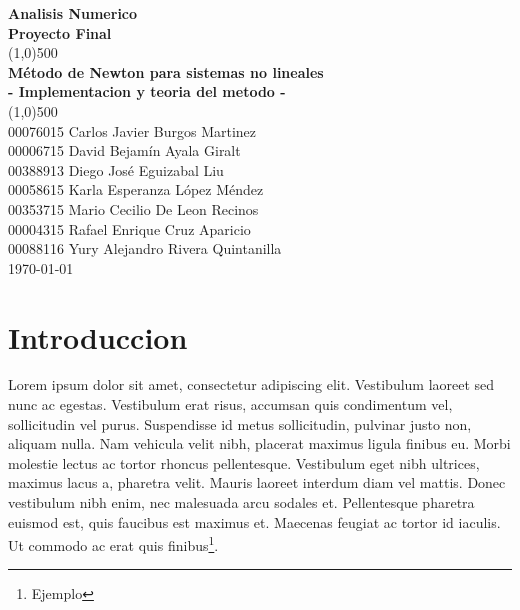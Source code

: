 \documentclass[11pt]{article}
\begin{document}
\begin{titlepage}

\begin{center}
\Large{\textbf{Analisis Numerico}}\\
\Large{\textbf{Proyecto Final}}\\
\vfill
\line(1,0){500}\\[1mm]

\huge{\textbf{Método de Newton para sistemas no lineales}}\\[3mm]
\Large{\textbf{- Implementacion y teoria del metodo -}}\\[1mm]

\line(1,0){500}\\
00076015 Carlos Javier Burgos Martinez\\
00006715 David Bejamín Ayala Giralt\\
00388913 Diego José Eguizabal Liu\\
00058615 Karla Esperanza López Méndez\\
00353715 Mario Cecilio De Leon Recinos\\
00004315 Rafael Enrique Cruz Aparicio \\
00088116 Yury Alejandro Rivera Quintanilla\\
\vfill
\today\\

\end{center}

\end{titlepage}

\tableofcontents
\thispagestyle{empty}
\clearpage

\setcounter{page}{1}

\section{Introduccion}

Lorem ipsum dolor sit amet, consectetur adipiscing elit. Vestibulum laoreet sed nunc ac egestas. Vestibulum erat risus, accumsan quis condimentum vel, sollicitudin vel purus. Suspendisse id metus sollicitudin, pulvinar justo non, aliquam nulla. Nam vehicula velit nibh, placerat maximus ligula finibus eu. Morbi molestie lectus ac tortor rhoncus pellentesque. Vestibulum eget nibh ultrices, maximus lacus a, pharetra velit. Mauris laoreet interdum diam vel mattis. Donec vestibulum nibh enim, nec malesuada arcu sodales et. Pellentesque pharetra euismod est, quis faucibus est maximus et. Maecenas feugiat ac tortor id iaculis. Ut commodo ac erat quis finibus\footnote{Ejemplo}.
\clearpage
\end{document}
